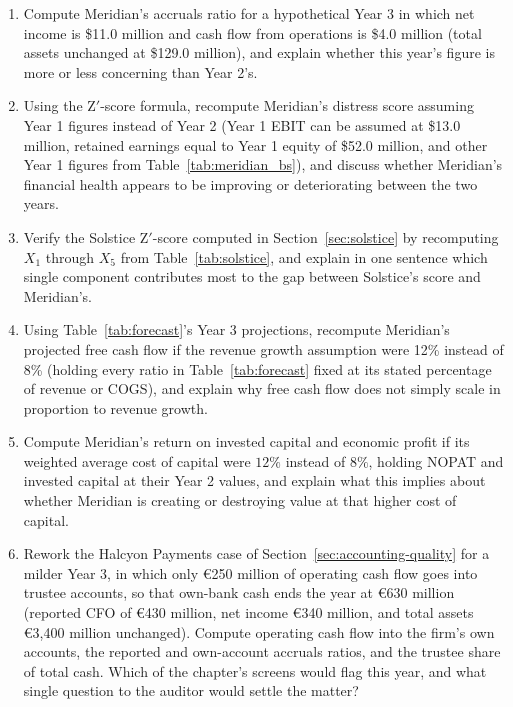 \documentclass[../ai_in_finance]{subfiles}
\begin{document}
\begin{enumerate}[exercises]
    \item Compute Meridian's accruals ratio for a hypothetical Year 3 in which net income is \$11.0 million and cash flow from operations is \$4.0 million (total assets unchanged at \$129.0 million), and explain whether this year's figure is more or less concerning than Year 2's.
    \item Using the Z$'$-score formula, recompute Meridian's distress score assuming Year 1 figures instead of Year 2 (Year 1 EBIT can be assumed at \$13.0 million, retained earnings equal to Year 1 equity of \$52.0 million, and other Year 1 figures from Table~\ref{tab:meridian_bs}), and discuss whether Meridian's financial health appears to be improving or deteriorating between the two years.
    \item Verify the Solstice Z$'$-score computed in Section~\ref{sec:solstice} by recomputing $X_1$ through $X_5$ from Table~\ref{tab:solstice}, and explain in one sentence which single component contributes most to the gap between Solstice's score and Meridian's.
    \item Using Table~\ref{tab:forecast}'s Year 3 projections, recompute Meridian's projected free cash flow if the revenue growth assumption were 12\% instead of 8\% (holding every ratio in Table~\ref{tab:forecast} fixed at its stated percentage of revenue or COGS), and explain why free cash flow does not simply scale in proportion to revenue growth.
    \item Compute Meridian's return on invested capital and economic profit if its weighted average cost of capital were $12\%$ instead of $8\%$, holding NOPAT and invested capital at their Year 2 values, and explain what this implies about whether Meridian is creating or destroying value at that higher cost of capital.
    \item Rework the Halcyon Payments case of Section~\ref{sec:accounting-quality} for a milder Year 3, in which only \euro250 million of operating cash flow goes into trustee accounts, so that own-bank cash ends the year at \euro630 million (reported CFO of \euro430 million, net income \euro340 million, and total assets \euro3,400 million unchanged). Compute operating cash flow into the firm's own accounts, the reported and own-account accruals ratios, and the trustee share of total cash. Which of the chapter's screens would flag this year, and what single question to the auditor would settle the matter?

\end{enumerate}
\end{document}
